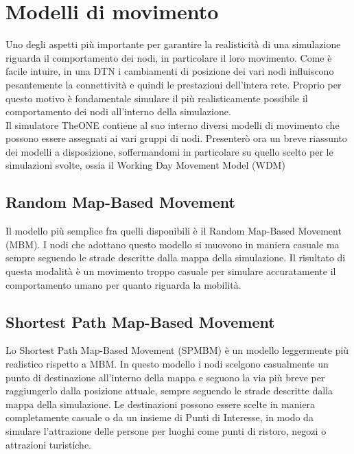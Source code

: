 
\chapter{Modelli di movimento}\label{movimento} %





Uno degli aspetti più importante per garantire la realisticità di una simulazione riguarda il comportamento dei nodi, in particolare il loro movimento. Come è facile intuire, in una DTN i cambiamenti di posizione dei vari nodi influiscono pesantemente la connettività e quindi le prestazioni dell'intera rete. Proprio per questo motivo è fondamentale simulare il più realisticamente possibile il comportamento dei nodi all'interno della simulazione.
\\

Il simulatore TheONE contiene al suo interno diversi modelli di movimento che possono essere assegnati ai vari gruppi di nodi. Presenterò ora un breve riassunto dei modelli a disposizione, soffermandomi in particolare su quello scelto per le simulazioni svolte, ossia il Working Day Movement Model (WDM)

\section{Random Map-Based Movement}
Il modello più semplice fra quelli disponibili è il Random Map-Based Movement (MBM). I nodi che adottano questo modello si muovono in maniera casuale ma sempre seguendo le strade descritte dalla mappa della simulazione. Il risultato di questa modalità è un movimento troppo casuale per simulare accuratamente il comportamento umano per quanto riguarda la mobilità.

\section{Shortest Path Map-Based Movement}
Lo Shortest Path Map-Based Movement (SPMBM) è un modello leggermente più realistico rispetto a MBM. In questo modello i nodi scelgono casualmente un punto di destinazione all'interno della mappa e seguono la via più breve per raggiungerlo dalla posizione attuale, sempre seguendo le strade descritte dalla mappa della simulazione. Le destinazioni possono essere scelte in maniera completamente casuale o da un insieme di Punti di Interesse, in modo da simulare l'attrazione delle persone per luoghi come punti di ristoro, negozi o attrazioni turistiche.

